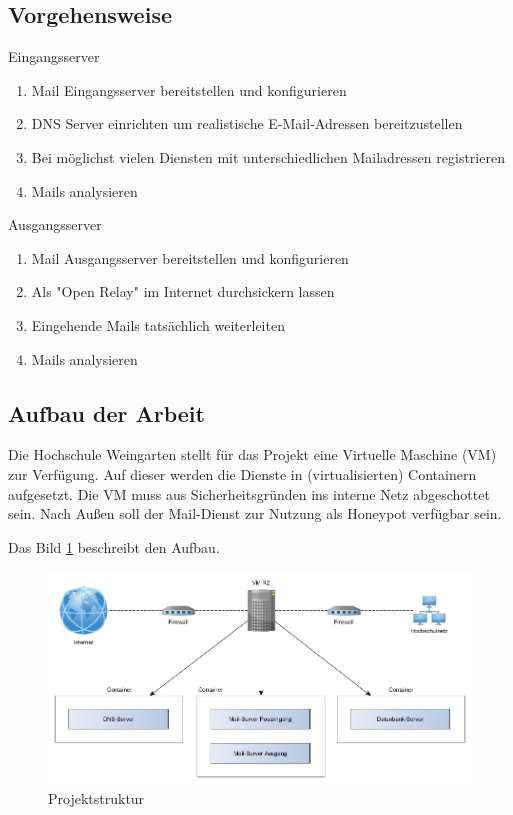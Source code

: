 \documentclass[a4paper,11pt,singlespacing]{article}
\begin{document}
	\subsection{Vorgehensweise}\label{sec:EinleitungVorgehensweise}
		Eingangsserver
		\begin{enumerate}
		\item Mail Eingangsserver bereitstellen und konfigurieren
		\item DNS Server einrichten um realistische E-Mail-Adressen bereitzustellen
		\item Bei möglichst vielen Diensten mit unterschiedlichen Mailadressen registrieren
		\item Mails analysieren
		\end{enumerate}

		Ausgangsserver
		\begin{enumerate}
		\item Mail Ausgangsserver bereitstellen und konfigurieren
		\item Als "Open Relay" im Internet durchsickern lassen %
		\item Eingehende Mails tatsächlich weiterleiten
		\item Mails analysieren
		\end{enumerate}

	\subsection{Aufbau der Arbeit}\label{sec:EinleitungAufbau}
		Die Hochschule Weingarten stellt für das Projekt eine Virtuelle Maschine (VM) zur Verfügung. %
		Auf dieser werden die Dienste in (virtualisierten) Containern aufgesetzt. %
		Die VM muss aus Sicherheitsgründen ins interne Netz abgeschottet sein.
		Nach Außen soll der Mail-Dienst zur Nutzung als Honeypot verfügbar sein.

		Das Bild \ref{fig:Hierarchy} beschreibt den Aufbau.

		\begin{figure}
		\includegraphics[width=\linewidth]{2-Hierarchy.png}
		\caption{Projektstruktur}
		\label{fig:Hierarchy}
		\end{figure}
\end{document}
